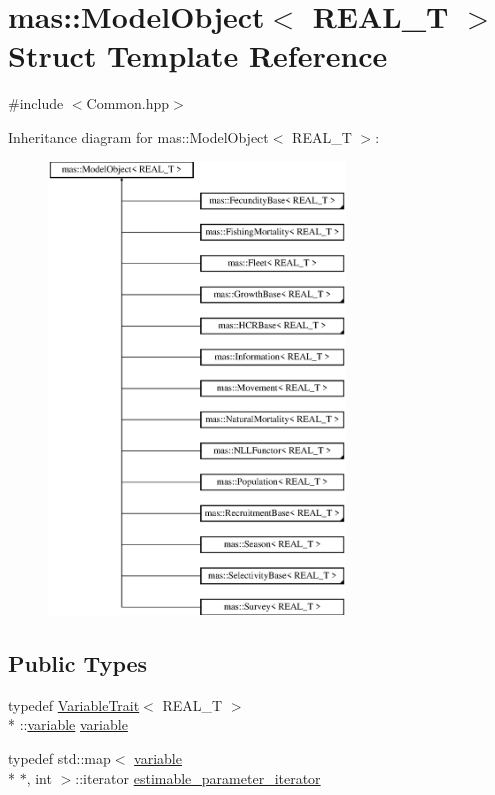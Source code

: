 \hypertarget{structmas_1_1_model_object}{\section{mas\-:\-:Model\-Object$<$ R\-E\-A\-L\-\_\-\-T $>$ Struct Template Reference}
\label{structmas_1_1_model_object}
}


{\ttfamily \#include $<$Common.\-hpp$>$}

Inheritance diagram for mas\-:\-:Model\-Object$<$ R\-E\-A\-L\-\_\-\-T $>$\-:\begin{figure}[H]
\begin{center}
\leavevmode
\includegraphics[height=12.000000cm]{structmas_1_1_model_object}
\end{center}
\end{figure}
\subsection*{Public Types}
\begin{DoxyCompactItemize}
\item 
typedef \hyperlink{structmas_1_1_variable_trait}{Variable\-Trait}$<$ R\-E\-A\-L\-\_\-\-T $>$\\*
\-::\hyperlink{structmas_1_1_model_object_a4e62fdbb5826f8fac311262b888ab10a}{variable} \hyperlink{structmas_1_1_model_object_a4e62fdbb5826f8fac311262b888ab10a}{variable}
\item 
typedef std\-::map$<$ \hyperlink{structmas_1_1_model_object_a4e62fdbb5826f8fac311262b888ab10a}{variable} \\*
$\ast$, int $>$\-::iterator \hyperlink{structmas_1_1_model_object_af95a47b3862d83583751c2d835887697}{estimable\-\_\-parameter\-\_\-iterator}
\end{DoxyCompactItemize}

